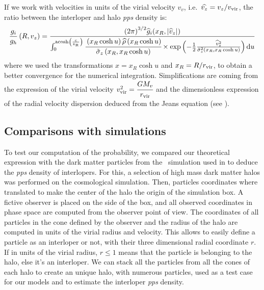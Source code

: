If we work with velocities in units of the virial velocity $v_v$, i.e.\
$\widehat{v_z}=v_z/v_{\rm vir}$, the ratio between the interloper and halo \emph{pps}
density is:
%
\begin{equation}
    \label{eq:gi_over_gh}
    \frac{g_i}{g_h}\left(R,v_z\right)=
    \frac{{\left(2\pi\right)}^{3/2}\widehat{g}_i{(x_R,|\widehat{v}_z|)}}
        {\int_0^{\rm{acosh}\left(\frac{c}{x_R}\right)}
            \cfrac{\left(x_R\cosh{u}\right)\widehat\rho\left(x_R\cosh{u}\right)}
            {{\tilde\sigma}_z\left(x_R,x_R\cosh{u}\right)}
    \times\exp\left(-\frac{1}{2}\frac{{\widehat{v}_z}^2}
    {{\tilde\sigma}_z^2\left(x_R,x_R\cosh{u}\right)}\right){\rm{d}} u}
\end{equation}
%
where we used the transformations $x=x_R\cosh u$ and $x_R=R/r_{\rm vir}$, to obtain a
better convergence for the numerical integration. Simplifications are coming
from the expression of the virial velocity $v_{\rm vir}^2=\cfrac{G M_v}{r_{\rm vir}}$
and the dimensionless expression of the radial velocity dispersion deduced from
the Jeans equation (see \bartrefappendix{profiles}).

\subsection{Comparisons with simulations}
\label{sub:comparisons_with_simulations}

To test our computation of the probability, we compared our theoretical
expression with the dark matter particles from the~\cite{Borgani+04} simulation
used in \citet{MBM+10} to deduce the \emph{pps} density of interlopers. For
this, a selection of high mass dark matter halos was performed on the
cosmological simulation. Then, particles coordinates where translated to make
the center of the halo the origin of the simulation box. A fictive observer is
placed on the side of the box, and all observed coordinates in phase space are
computed from the observer point of view. The coordinates of all particles in
the cone defined by the observer and the radius of the halo are computed in
units of the virial radius and velocity. This allows to easily define a
particle as an interloper or not, with their three dimensional radial
coordinate $r$. If in units of the virial radius, $r\leqslant1$ means that the
particle is belonging to the halo, else it's an interloper. We can stack all
the particles from all the cones of each halo to create an unique halo, with
numerous particles, used as a test case for our models and to estimate the
interloper \emph{pps} density.

